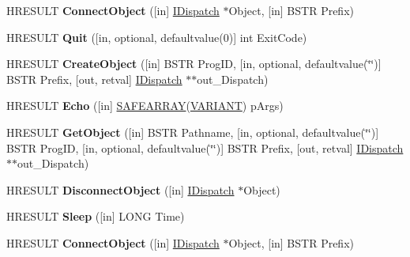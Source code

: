 \begin{DoxyCompactItemize}
\mbox{\label{interface_i_host_1_1_i_host_a8b7b7ddba67fe5c1ff63add73c8f86cd}} 
H\+R\+E\+S\+U\+LT {\bfseries Connect\+Object} (\mbox{[}in\mbox{]} \hyperlink{interface_i_dispatch}{I\+Dispatch} $\ast$Object, \mbox{[}in\mbox{]} B\+S\+TR Prefix)
\item 
\mbox{\label{interface_i_host_1_1_i_host_a81a69a12262df56f5e874f221c641ccc}} 
H\+R\+E\+S\+U\+LT {\bfseries Quit} (\mbox{[}in, optional, defaultvalue(0)\mbox{]} int Exit\+Code)
\item 
\mbox{\label{interface_i_host_1_1_i_host_a986dd6cc64bbc0fcfd4a4a4f923f0113}} 
H\+R\+E\+S\+U\+LT {\bfseries Create\+Object} (\mbox{[}in\mbox{]} B\+S\+TR Prog\+ID, \mbox{[}in, optional, defaultvalue(\char`\"{}\char`\"{})\mbox{]} B\+S\+TR Prefix, \mbox{[}out, retval\mbox{]} \hyperlink{interface_i_dispatch}{I\+Dispatch} $\ast$$\ast$out\+\_\+\+Dispatch)
\item 
\mbox{\label{interface_i_host_1_1_i_host_a761a314d256069bf5a2488a7107ab74e}} 
H\+R\+E\+S\+U\+LT {\bfseries Echo} (\mbox{[}in\mbox{]} \hyperlink{structtag_s_a_f_e_a_r_r_a_y}{S\+A\+F\+E\+A\+R\+R\+AY}(\hyperlink{structtag_v_a_r_i_a_n_t}{V\+A\+R\+I\+A\+NT}) p\+Args)
\item 
\mbox{\label{interface_i_host_1_1_i_host_a8c4a556bae66772b3b5816e31d3be2ae}} 
H\+R\+E\+S\+U\+LT {\bfseries Get\+Object} (\mbox{[}in\mbox{]} B\+S\+TR Pathname, \mbox{[}in, optional, defaultvalue(\char`\"{}\char`\"{})\mbox{]} B\+S\+TR Prog\+ID, \mbox{[}in, optional, defaultvalue(\char`\"{}\char`\"{})\mbox{]} B\+S\+TR Prefix, \mbox{[}out, retval\mbox{]} \hyperlink{interface_i_dispatch}{I\+Dispatch} $\ast$$\ast$out\+\_\+\+Dispatch)
\item 
\mbox{\label{interface_i_host_1_1_i_host_abcfe9454f9fdcab46658419061a4edb9}} 
H\+R\+E\+S\+U\+LT {\bfseries Disconnect\+Object} (\mbox{[}in\mbox{]} \hyperlink{interface_i_dispatch}{I\+Dispatch} $\ast$Object)
\item 
\mbox{\label{interface_i_host_1_1_i_host_a7420873c322fcec24bc6296c8d6e5a62}} 
H\+R\+E\+S\+U\+LT {\bfseries Sleep} (\mbox{[}in\mbox{]} L\+O\+NG Time)
\item 
\mbox{\label{interface_i_host_1_1_i_host_a8b7b7ddba67fe5c1ff63add73c8f86cd}} 
H\+R\+E\+S\+U\+LT {\bfseries Connect\+Object} (\mbox{[}in\mbox{]} \hyperlink{interface_i_dispatch}{I\+Dispatch} $\ast$Object, \mbox{[}in\mbox{]} B\+S\+TR Prefix)
\end{DoxyCompactItemize}
